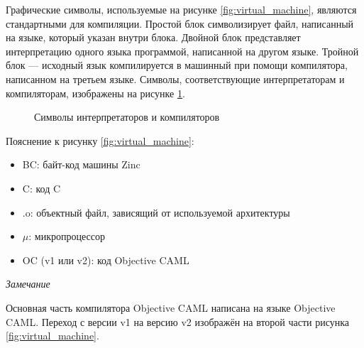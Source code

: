 Графические символы, используемые на рисунке \ref{fig:virtual_machine}, являются
стандартными для компиляции. Простой блок символизирует файл, написанный на
языке, который указан внутри блока. Двойной блок представляет интерпретацию
одного языка программой, написанной на другом языке. Тройной блок --- исходный
язык компилируется в машинный при помощи компилятора, написанном на третьем
языке. Символы, соответствующие интерпретаторам и компиляторам, изображены на
рисунке \ref{fig:graphical_notation_for_interpreters_and_compilers}.

\begin{figure}[h]
	\caption{\label{fig:graphical_notation_for_interpreters_and_compilers}
Символы интерпретаторов и компиляторов}
\end{figure}

Пояснение к рисунку \ref{fig:virtual_machine}:

\begin{itemize}
	\item BC: байт-код машины Zinc

	\item C: код C

	\item .o: объектный файл, зависящий от используемой архитектуры

	\item $\mu$: микропроцессор

	\item OC (v1 или v2): код Objective CAML
\end{itemize}


{\it Замечание}

Основная часть компилятора Objective CAML написана на языке Objective CAML.
Переход с версии v1 на версию v2 изображён на второй части рисунка
\ref{fig:virtual_machine}.


